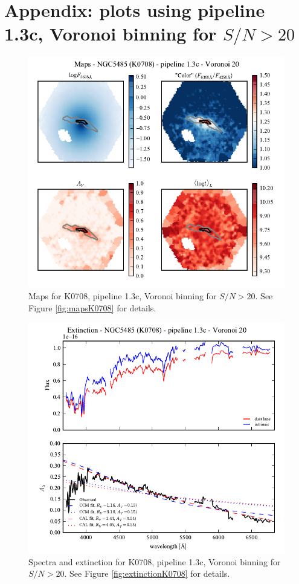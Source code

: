 \documentclass[a4paper]{article}
\begin{document}



\appendix

\section{Appendix: plots using pipeline 1.3c, Voronoi binning for $S/N > 20$}
\label{sec:app13c}

\begin{figure}[H]
\includegraphics{figures/maps_K0708_1.3c_v20.pdf}
\caption{Maps for K0708, pipeline 1.3c, Voronoi binning for $S/N > 20$. See
Figure \ref{fig:mapsK0708} for details.}
\label{fig:maps_K0708_13c_v20}
\end{figure}

\begin{figure}[H]
\includegraphics{figures/spectra_K0708_1.3c_v20.pdf}
\caption{Spectra and extinction for K0708, pipeline 1.3c, Voronoi binning for
$S/N > 20$. See Figure \ref{fig:extinctionK0708} for details.}
\end{figure}
\end{document}
